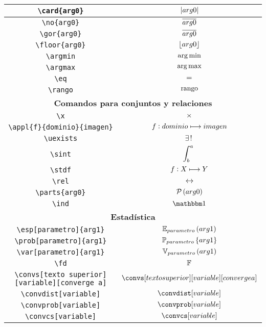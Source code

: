 \begin{longtable}{|c|c|}
\verb|\card{arg0}| & $\displaystyle\left\vert arg0 \right\vert$ \\ \hline 
\verb|\no{arg0}| & $\displaystyle\overline{arg0}$ \\ \hline 
\verb|\gor{arg0}| & $\displaystyle\overline{arg0}$ \\ \hline 
\verb|\floor{arg0}| & $\displaystyle\left\lfloor arg0 \right\rfloor$ \\ \hline 
\verb|\argmin| & $\displaystyle\operatorname*{arg\,min}$ \\ \hline 
\verb|\argmax| & $\displaystyle\operatorname*{arg\,max}$ \\ \hline 
\verb|\eq| & $\displaystyle=$ \\ \hline 
\verb|\rango| & $\displaystyle\operatorname{rango}$ \\ \hline 
\multicolumn{2}{|c|}{\textbf{Comandos para conjuntos y relaciones}} \\ \hline 
\verb|\x| & $\displaystyle\times$ \\ \hline 
\verb|\appl{f}{dominio}{imagen}| & $\displaystyle f : dominio\longmapsto imagen$ \\ \hline 
\verb|\uexists| & $\displaystyle\exists\, !\;$ \\ \hline 
\verb|\sint| & $\displaystyle\int_b^a\;$ \\ \hline 
\verb|\stdf| & $\displaystyle f : X\longmapsto Y$ \\ \hline 
\verb|\rel| & $\displaystyle\rel$ \\ \hline 
\verb|\parts{arg0}| & $\displaystyle\mathcal{P}\left(arg0\right)$ \\ \hline 
\verb|\ind| & $\displaystyle\ind$ \\ \hline 
\multicolumn{2}{|c|}{\textbf{Estadística}} \\ \hline 
\verb|\esp[parametro]{arg1}| & $\displaystyle\esp[parametro]{arg1}$ \\ \hline 
\verb|\prob[parametro]{arg1}| & $\displaystyle\prob[parametro]{arg1}$ \\ \hline 
\verb|\var[parametro]{arg1}| & $\displaystyle\var[parametro]{arg1}$ \\ \hline 
\verb|\fd| & $\displaystyle\mathbb{F}$ \\ \hline 
\verb|\convs[texto superior][variable][converge a]| & $\displaystyle\convs[texto superior][variable][converge a]$ \\ \hline 
\verb|\convdist[variable]| & $\displaystyle\convdist[variable]$ \\ \hline 
\verb|\convprob[variable]| & $\displaystyle\convprob[variable]$ \\ \hline 
\verb|\convcs[variable]| & $\displaystyle\convcs[variable]$ \\ \hline 

\end{longtable}
